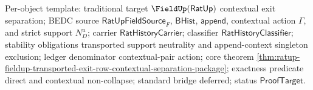 Per-object template: traditional target $\FieldUp(\mathsf{RatUp})$ contextual
exit separation; BEDC source $\mathsf{RatUpFieldSource}_F$, $\mathsf{BHist}$,
$\mathsf{append}$, contextual action $\Gamma$, and strict support $N_D^u$;
carrier $\mathsf{RatHistoryCarrier}$; classifier
$\mathsf{RatHistoryClassifier}$; stability obligations transported support
neutrality and append-context singleton exclusion; ledger denominator
contextual-pair action; core theorem
\autoref{thm:ratup-fieldup-transported-exit-row-contextual-separation-package};
exactness predicate direct and contextual non-collapse; standard bridge
deferred; status $\mathsf{ProofTarget}$.
